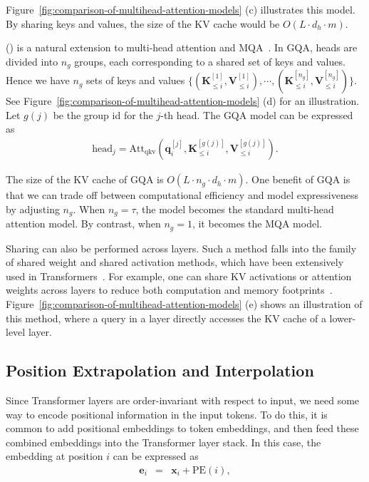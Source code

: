 \noindent Figure~\ref{fig:comparison-of-multihead-attention-models} (c) illustrates this model. By sharing keys and values, the size of the KV cache would be $O(L \cdot d_h \cdot m)$.

 () is a natural extension to multi-head attention and MQA~\cite{ainslie-etal:2023gqa}. In GQA, heads are divided into $n_g$ groups, each corresponding to a shared set of keys and values. Hence we have $n_g$ sets of keys and values $\{(\mathbf{K}_{\le i}^{[1]},\mathbf{V}_{\le i}^{[1]}),\cdots,(\mathbf{K}_{\le i}^{[n_g]},\mathbf{V}_{\le i}^{[n_g]})\}$. See Figure~\ref{fig:comparison-of-multihead-attention-models} (d) for an illustration. Let $g(j)$ be the group id for the $j$-th head. The GQA model can be expressed as
\begin{eqnarray}
\mathrm{head}_j = \mathrm{Att}_{\mathrm{qkv}}(\mathbf{q}_{i}^{[j]},\mathbf{K}_{\le i}^{[g(j)]},\mathbf{V}_{\le i}^{[g(j)]}).
\end{eqnarray}

\noindent The size of the KV cache of GQA is $O(L \cdot n_g \cdot d_h \cdot m)$. One benefit of GQA is that we can trade off between computational efficiency and model expressiveness by adjusting $n_g$. When $n_g = \tau$, the model becomes the standard multi-head attention model. By contrast, when $n_g = 1$, it becomes the MQA model.

Sharing can also be performed across layers. Such a method falls into the family of shared weight and shared activation methods, which have been extensively used in Transformers~\cite{dehghani-etal:2018universal,lan-etal:2020albert}. For example, one can share KV activations or attention weights across layers to reduce both computation and memory footprints~\cite{xiao-etal:2019sharing,brandon-etal:2024reducing}. Figure~\ref{fig:comparison-of-multihead-attention-models} (e) shows an illustration of this method, where a query in a layer directly accesses the KV cache of a lower-level layer.

\subsection{Position Extrapolation and Interpolation}

\noindent Since Transformer layers are order-invariant with respect to input, we need some way to encode positional information in the input tokens. To do this, it is common to add positional embeddings to token embeddings, and then feed these combined embeddings into the Transformer layer stack. In this case, the embedding at position $i$ can be expressed as
\begin{eqnarray}
\mathbf{e}_i & = & \mathbf{x}_i + \mathrm{PE}(i) \label{eq:long-context-pe-base},
\end{eqnarray}

